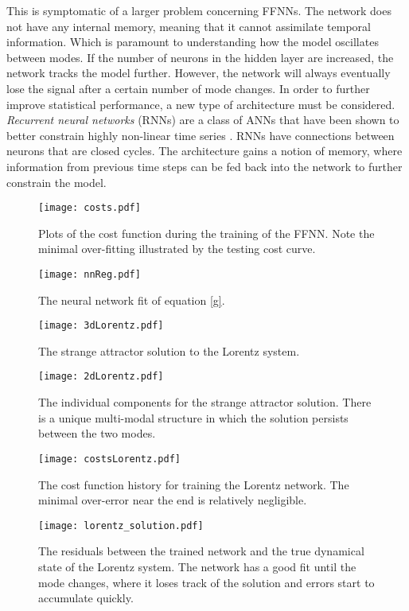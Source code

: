 This is symptomatic of a larger problem concerning FFNNs. The network does not have any internal memory, meaning that it cannot assimilate temporal information. Which is paramount to understanding how the model oscillates between modes. If the number of neurons in the hidden layer are increased, the network tracks the model further. However, the network will always eventually lose the signal after a certain number of mode changes. In order to further improve statistical performance, a new type of architecture must be considered. \textit{Recurrent neural networks} (RNNs) are a class of ANNs that have been shown to better constrain highly non-linear time series \cite{seidl1991}. RNNs have connections between neurons that are closed cycles. The architecture gains a notion of memory, where information from previous time steps can be fed back into the network to further constrain the model.
\begin{figure}[!htb]
\centering
\texttt{[image: costs.pdf]}
\caption{Plots of the cost function during the training of the FFNN. Note the minimal over-fitting illustrated by the testing cost curve.}
\label{fig:costReg}
\end{figure}
\begin{figure}[!htb]
\centering
\texttt{[image: nnReg.pdf]}
\caption{The neural network fit of equation \ref{g}.}
\label{fig:nnReg}
\end{figure}
\begin{figure}[!htb]
\centering
\texttt{[image: 3dLorentz.pdf]}
\caption{The strange attractor solution to the Lorentz system.}
\label{fig:3d Lorentz}
\end{figure}
\begin{figure}[!htb]
\centering
\texttt{[image: 2dLorentz.pdf]}
\caption{The individual components for the strange attractor solution. There is a unique multi-modal structure in which the solution persists between the two modes.}
\label{fig:2d Lorentz}
\end{figure}
\begin{figure}[!htb]
\centering
\texttt{[image: costsLorentz.pdf]}
\caption{The cost function history for training the Lorentz network. The minimal over-error near the end is relatively negligible.}
\label{fig:costs Lorentz}
\end{figure}
\begin{figure}[!htb]
\centering
\texttt{[image: lorentz\_solution.pdf]}
\caption{The residuals between the trained network and the true dynamical state of the Lorentz system. The network has a good fit until the mode changes, where it loses track of the solution and errors start to accumulate quickly.}
\label{fig:nn Lorentz}
\end{figure}